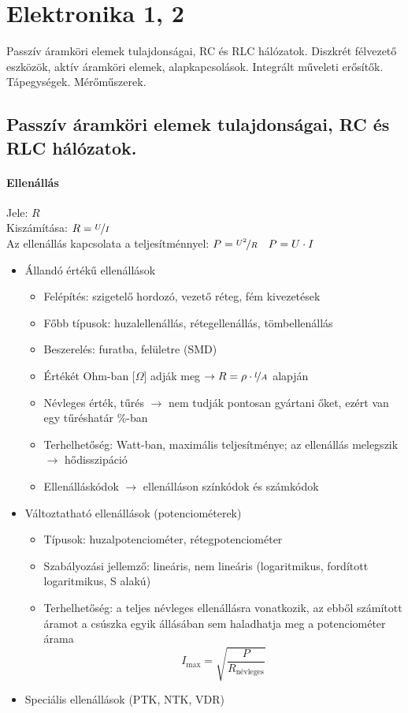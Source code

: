 \section{Elektronika 1, 2}
{\footnotesize Passzív áramköri elemek tulajdonságai, RC és RLC hálózatok. Diszkrét félvezető eszközök, aktív áramköri elemek, alapkapcsolások. Integrált műveleti erősítők. Tápegységek. Mérőműszerek.}
\subsection{Passzív áramköri elemek tulajdonságai, RC és RLC hálózatok.}
\paragraph{Ellenállás}
Jele: $R$\\
Kiszámítása: $R = \nicefrac{U}{I}$\\
Az ellenállás kapcsolata a teljesítménnyel: $P=\nicefrac{U^2}{R}\quad P=U \cdot I$\\
\begin{itemize}[nosep]
	\item Állandó értékű ellenállások
	\begin{itemize}[nosep]
		\item Felépítés: szigetelő hordozó, vezető réteg, fém kivezetések
		\item Főbb típusok: huzalellenállás, rétegellenállás, tömbellenállás
		\item Beszerelés: furatba, felületre (SMD)
		\item Értékét Ohm-ban [$\Omega$] adják meg  $\rightarrow R = \rho \cdot \nicefrac{l}{A}$ alapján
		\item Névleges érték, tűrés $\rightarrow$ nem tudják pontosan gyártani őket, ezért van egy tűréshatár \%-ban
		\item Terhelhetőség: Watt-ban, maximális teljesítménye; az ellenállás melegszik $\rightarrow$ hődisszipáció
		\item Ellenálláskódok $\rightarrow$ ellenálláson színkódok és számkódok
	\end{itemize}
	\item Változtatható ellenállások (potenciométerek)
	\begin{itemize}[nosep]
		\item Típusok: huzalpotenciométer, rétegpotenciométer
		\item Szabályozási jellemző: lineáris, nem lineáris (logaritmikus, fordított logaritmikus, S alakú)
		\item Terhelhetőség: a teljes névleges ellenállásra vonatkozik, az ebből számított áramot a csúszka egyik állásában sem haladhatja meg a potenciométer árama $$I_{\max} = \sqrt{\frac{P}{R_\text{névleges}}}$$
	\end{itemize}
	\item Speciális ellenállások (PTK, NTK, VDR)
\end{itemize}

